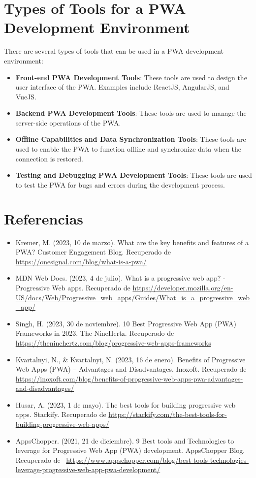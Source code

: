 \documentclass[12pt]{article}
\begin{document}
	\section{Types of Tools for a PWA Development Environment}
	There are several types of tools that can be used in a PWA development environment:
	\begin{itemize}
		\item \textbf{Front-end PWA Development Tools}: These tools are used to design the user interface of the PWA. Examples include ReactJS, AngularJS, and VueJS.
		\item \textbf{Backend PWA Development Tools}: These tools are used to manage the server-side operations of the PWA.
		\item \textbf{Offline Capabilities and Data Synchronization Tools}: These tools are used to enable the PWA to function offline and synchronize data when the connection is restored.
		\item \textbf{Testing and Debugging PWA Development Tools}: These tools are used to test the PWA for bugs and errors during the development process.
	\end{itemize}
	\newpage
	\section{Referencias}
	\begin{itemize}
		\item Kremer, M. (2023, 10 de marzo). What are the key benefits and features of a PWA? Customer Engagement Blog. Recuperado de \url{https://onesignal.com/blog/what-is-a-pwa/}
		\item MDN Web Docs. (2023, 4 de julio). What is a progressive web app? - Progressive Web apps. Recuperado de \url{https://developer.mozilla.org/en-US/docs/Web/Progressive_web_apps/Guides/What_is_a_progressive_web_app/}
		\item Singh, H. (2023, 30 de noviembre). 10 Best Progressive Web App (PWA) Frameworks in 2023. The NineHertz. Recuperado de \url{https://theninehertz.com/blog/progressive-web-apps-frameworks}
		\item Kvartalnyi, N., \& Kvartalnyi, N. (2023, 16 de enero). Benefits of Progressive Web Apps (PWA) – Advantages and Disadvantages. Inoxoft. Recuperado de \url{https://inoxoft.com/blog/benefits-of-progressive-web-apps-pwa-advantages-and-disadvantages/}
		\item Husar, A. (2023, 1 de mayo). The best tools for building progressive web apps. Stackify. Recuperado de \url{https://stackify.com/the-best-tools-for-building-progressive-web-apps/}
		\item AppsChopper. (2021, 21 de diciembre). 9 Best tools and Technologies to leverage for Progressive Web App (PWA) development. AppsChopper Blog. Recuperado de \ \url{https://www.appschopper.com/blog/best-tools-technologies-leverage-progressive-web-app-pwa-development/}
	\end{itemize}

	
	
\end{document}
